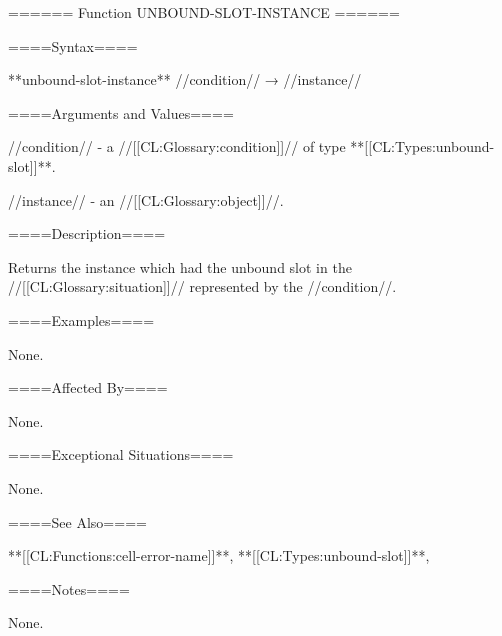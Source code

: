 ====== Function UNBOUND-SLOT-INSTANCE ======

====Syntax====

**unbound-slot-instance** //condition// → //instance//

====Arguments and Values====

//condition// - a //[[CL:Glossary:condition]]// of type **[[CL:Types:unbound-slot]]**.

//instance// - an //[[CL:Glossary:object]]//.

====Description====

Returns the instance which had the unbound slot in the //[[CL:Glossary:situation]]// represented by the //condition//.

====Examples====

None.

====Affected By====

None.

====Exceptional Situations====

None.

====See Also====

**[[CL:Functions:cell-error-name]]**, **[[CL:Types:unbound-slot]]**,{\secref\ConditionSystemConcepts}

====Notes====

None.


